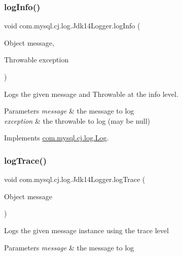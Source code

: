 \subsubsection{\texorpdfstring{log\+Info()}{logInfo()}\hspace{0.1cm}{\footnotesize\ttfamily [2/2]}}
{\footnotesize\ttfamily void com.\+mysql.\+cj.\+log.\+Jdk14\+Logger.\+log\+Info (\begin{DoxyParamCaption}\item[{Object}]{message,  }\item[{Throwable}]{exception }\end{DoxyParamCaption})}

Logs the given message and Throwable at the \textquotesingle{}info\textquotesingle{} level.


\begin{DoxyParams}{Parameters}
{\em message} & the message to log \\
\hline
{\em exception} & the throwable to log (may be null) \\
\hline
\end{DoxyParams}


Implements \mbox{\hyperlink{interfacecom_1_1mysql_1_1cj_1_1log_1_1_log_abad2a5a44ff04b24bf46a58997e4f7da}{com.\+mysql.\+cj.\+log.\+Log}}.

\mbox{\label{classcom_1_1mysql_1_1cj_1_1log_1_1_jdk14_logger_a31e22a245c6b07299ada95de3858d960}} 
\subsubsection{\texorpdfstring{log\+Trace()}{logTrace()}\hspace{0.1cm}{\footnotesize\ttfamily [1/2]}}
{\footnotesize\ttfamily void com.\+mysql.\+cj.\+log.\+Jdk14\+Logger.\+log\+Trace (\begin{DoxyParamCaption}\item[{Object}]{message }\end{DoxyParamCaption})}

Logs the given message instance using the \textquotesingle{}trace\textquotesingle{} level


\begin{DoxyParams}{Parameters}
{\em message} & the message to log \\
\hline
\end{DoxyParams}


